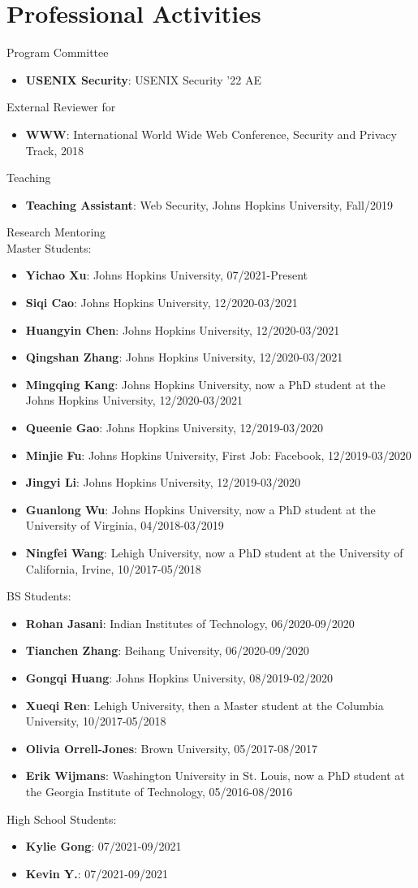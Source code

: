 \documentclass[letterpaper,11pt]{article}
\newcommand{\resumeItem}[2]{
  \item\small{
    \textbf{#1}{: #2 \vspace{-2pt}}
  }
}
\newcommand{\resumeItemListStart}{\begin{itemize}}
\newcommand{\resumeItemListEnd}{\end{itemize}\vspace{-5pt}}
\begin{document}
\section{Professional Activities}
Program Committee
\resumeItemListStart
\resumeItem{USENIX Security}{USENIX Security '22 AE}
\resumeItemListEnd
External Reviewer for 
\resumeItemListStart
\resumeItem{WWW}{International World Wide Web Conference, Security and Privacy Track, 2018}    
\resumeItemListEnd	
Teaching
\resumeItemListStart
\resumeItem{Teaching Assistant}{Web Security, Johns Hopkins University, Fall/2019}
\resumeItemListEnd
Research Mentoring\\
	\quad Master Students:
    \resumeItemListStart
    \resumeItem{Yichao Xu}{ Johns Hopkins University, 07/2021-Present}
     \resumeItem{Siqi Cao}{Johns Hopkins University, 12/2020-03/2021}
    \resumeItem{Huangyin Chen}{Johns Hopkins University, 12/2020-03/2021}
    \resumeItem{Qingshan Zhang}{Johns Hopkins University, 12/2020-03/2021}
    \resumeItem{Mingqing Kang}{Johns Hopkins University, now a PhD student at the Johns Hopkins University, 12/2020-03/2021}
    \resumeItem{Queenie Gao}{Johns Hopkins University, 12/2019-03/2020}
    \resumeItem{Minjie Fu}{Johns Hopkins University, First Job: Facebook, 12/2019-03/2020}
    \resumeItem{Jingyi Li}{Johns Hopkins University, 12/2019-03/2020}
    \resumeItem{Guanlong Wu}{Johns Hopkins University, now a PhD student at the University of Virginia, 04/2018-03/2019}
    \resumeItem{Ningfei Wang}{Lehigh University, now a PhD student at the University of California, Irvine, 10/2017-05/2018}
    \resumeItemListEnd
\quad BS Students:
\resumeItemListStart	
	\resumeItem{Rohan Jasani}{Indian Institutes of Technology, 06/2020-09/2020}
	\resumeItem{Tianchen Zhang}{Beihang University, 06/2020-09/2020}
    \resumeItem{Gongqi Huang}{Johns Hopkins University, 08/2019-02/2020}
    \resumeItem{Xueqi Ren}{Lehigh University, then a Master student at the Columbia University, 10/2017-05/2018}    
    \resumeItem{Olivia Orrell-Jones}{Brown University, 05/2017-08/2017}	
    \resumeItem{Erik Wijmans}{Washington University in St. Louis, now a PhD student at the Georgia Institute of Technology, 05/2016-08/2016}	
	\resumeItemListEnd
\quad High School Students:
\resumeItemListStart	
    \resumeItem{Kylie Gong}{07/2021-09/2021}
	\resumeItem{Kevin Y.}{07/2021-09/2021}	
\resumeItemListEnd
\end{document}
